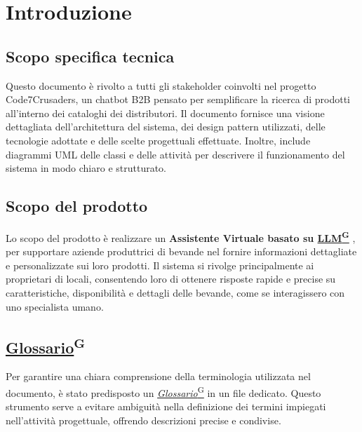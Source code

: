\section{Introduzione}

\subsection{Scopo specifica tecnica}
Questo documento è rivolto a tutti gli stakeholder coinvolti nel progetto Code7Crusaders, un chatbot B2B pensato per semplificare la ricerca di prodotti all'interno dei cataloghi dei distributori.
Il documento fornisce una visione dettagliata dell’architettura del sistema, dei design pattern utilizzati, delle tecnologie adottate e delle scelte progettuali effettuate. Inoltre, include diagrammi UML delle classi e delle attività per descrivere il funzionamento del sistema in modo chiaro e strutturato.
  
\subsection{Scopo del prodotto}
Lo scopo del prodotto è realizzare un \textbf{Assistente Virtuale basato su \href{https://code7crusaders.github.io/docs/\href{https://code7crusaders.github.io/docs/PB/documentazione_interna/glossario.html#pb-product-baseline}{PB\textsuperscript{G}}/documentazione_interna/glossario.html#llm-large-language-model}{LLM\textsuperscript{G}} }, 
per supportare aziende produttrici di bevande nel fornire 
informazioni dettagliate e personalizzate sui loro prodotti. 
Il sistema si rivolge principalmente ai proprietari di locali, 
consentendo loro di ottenere risposte rapide e precise su caratteristiche, 
disponibilità e dettagli delle bevande, come se interagissero con uno specialista umano.

\subsection{\href{https://code7crusaders.github.io/docs/\href{https://code7crusaders.github.io/docs/PB/documentazione_interna/glossario.html#pb-product-baseline}{PB\textsuperscript{G}}/documentazione_interna/glossario.html#glossario}{Glossario}\textsuperscript{G}}
Per garantire una chiara comprensione della terminologia utilizzata nel documento,
è stato predisposto un \href{https://code7crusaders.github.io/docs/PB/documentazione_interna/glossario.html#glossario}{\emph{Glossario}\textsuperscript{G}} in un file dedicato. Questo strumento 
serve a evitare ambiguità nella definizione dei termini impiegati nell’attività progettuale, 
offrendo descrizioni precise e condivise. 



